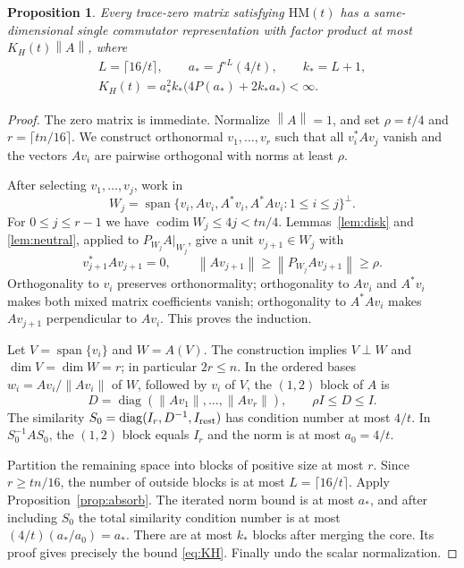 \documentclass[11pt]{article}
\newtheorem{proposition}[theorem]{Proposition}
\theoremstyle{remark}
\newcommand{\diag}{\operatorname{diag}}
\newcommand{\codim}{\operatorname{codim}}
\newcommand{\Span}{\operatorname{span}}
\newcommand{\norm}[1]{\left\lVert#1\right\rVert}
\newcommand{\HM}{\mathrm{HM}}
\numberwithin{equation}{section}
\begin{document}
\begin{proposition}\label{prop:high}
Every trace-zero matrix satisfying $\HM(t)$ has a same-dimensional single
commutator representation with factor product at most $K_H(t)\norm A$, where
\begin{equation}\label{eq:KH}
\begin{gathered}
 L=\lceil16/t\rceil,\qquad a_*=f^{\circ L}(4/t),\qquad k_*=L+1,\\
 K_H(t)=a_*^2k_*\bigl(4P(a_*)+2k_*a_*\bigr)<\infty.
\end{gathered}
\end{equation}
\end{proposition}
\begin{proof}
The zero matrix is immediate. Normalize $\norm A=1$, and set
$\rho=t/4$ and $r=\lceil tn/16\rceil$. We construct orthonormal
$v_1,\ldots,v_r$ such that all $v_i^*Av_j$ vanish and the vectors $Av_i$ are
pairwise orthogonal with norms at least $\rho$.

After selecting $v_1,\ldots,v_j$, work in
\[
 W_j=\Span\{v_i,Av_i,A^*v_i,A^*Av_i:1\le i\le j\}^{\perp}.
\]
For $0\le j\le r-1$ we have
$\codim W_j\le4j<tn/4$. Lemmas~\ref{lem:disk} and \ref{lem:neutral}, applied
to $P_{W_j}A|_{W_j}$, give a unit $v_{j+1}\in W_j$ with
\[
 v_{j+1}^*Av_{j+1}=0,\qquad
 \norm{Av_{j+1}}\ge\norm{P_{W_j}Av_{j+1}}\ge\rho.
\]
Orthogonality to $v_i$ preserves orthonormality; orthogonality to $Av_i$ and
$A^*v_i$ makes both mixed matrix coefficients vanish; orthogonality to
$A^*Av_i$ makes $Av_{j+1}$ perpendicular to $Av_i$. This proves the induction.

Let $V=\Span\{v_i\}$ and $W=A(V)$. The construction implies $V\perp W$ and
$\dim V=\dim W=r$; in particular $2r\le n$. In the ordered bases
$w_i=Av_i/\norm{Av_i}$ of $W$, followed by $v_i$ of $V$, the $(1,2)$ block of
$A$ is
\[
 D=\diag(\norm{Av_1},\ldots,\norm{Av_r}),\qquad \rho I\le D\le I.
\]
The similarity $S_0=\diag(I_r,D^{-1},I_{\rm rest})$ has condition number at
most $4/t$. In $S_0^{-1}AS_0$, the $(1,2)$ block equals $I_r$ and the norm is
at most $a_0=4/t$.

Partition the remaining space into blocks of positive size at most $r$. Since
$r\ge tn/16$, the number of outside blocks is at most $L=\lceil16/t\rceil$.
Apply Proposition~\ref{prop:absorb}. The iterated norm bound is at most $a_*$,
and after including $S_0$ the total similarity condition number is at most
$(4/t)(a_*/a_0)=a_*$. There are at most $k_*$ blocks after merging the core.
Its proof gives precisely the bound \eqref{eq:KH}. Finally undo the scalar
normalization.
\end{proof}
\end{document}
